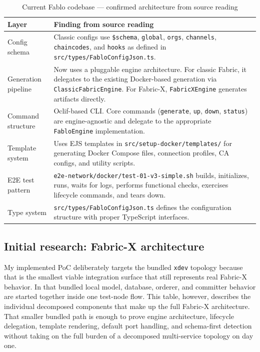 \begin{table}[h]
\centering
\begin{tabularx}{\textwidth}{|l|X|}
\hline
\textbf{Layer} & \textbf{Finding from source reading} \\
\hline
Config schema & Classic configs use \texttt{\$schema}, \texttt{global}, \texttt{orgs}, \texttt{channels}, \texttt{chaincodes}, and \texttt{hooks} as defined in \texttt{src/types/FabloConfigJson.ts}. \\
\hline
Generation pipeline & Now uses a pluggable engine architecture. For classic Fabric, it delegates to the existing Docker-based generation via \texttt{ClassicFabricEngine}. For Fabric-X, \texttt{FabricXEngine} generates artifacts directly. \\
\hline
Command structure & Oclif-based CLI. Core commands (\texttt{generate}, \texttt{up}, \texttt{down}, \texttt{status}) are engine-agnostic and delegate to the appropriate \texttt{FabloEngine} implementation. \\
\hline
Template system & Uses EJS templates in \texttt{src/setup-docker/templates/} for generating Docker Compose files, connection profiles, CA configs, and utility scripts. \\
\hline
E2E test pattern & \texttt{e2e-network/docker/test-01-v3-simple.sh} builds, initializes, runs, waits for logs, performs functional checks, exercises lifecycle commands, and tears down. \\
\hline
Type system & \texttt{src/types/FabloConfigJson.ts} defines the configuration structure with proper TypeScript interfaces. \\
\hline
\end{tabularx}
\caption{Current Fablo codebase --- confirmed architecture from source reading}
\label{tab:fablo-analysis}
\end{table}

\subsection{Initial research: Fabric-X architecture}

My implemented PoC deliberately targets the bundled \texttt{xdev} topology because that is the smallest viable integration surface that still represents real Fabric-X behavior. In that bundled local model, database, orderer, and committer behavior are started together inside one test-node flow. This table, however, describes the individual decomposed components that make up the full Fabric-X architecture. That smaller bundled path is enough to prove engine architecture, lifecycle delegation, template rendering, default port handling, and schema-first detection without taking on the full burden of a decomposed multi-service topology on day one.

